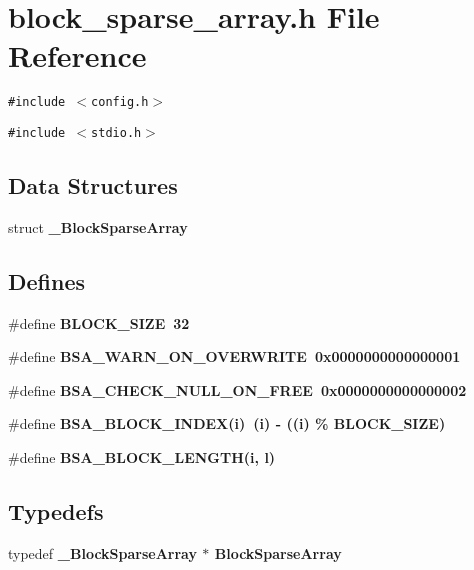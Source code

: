 \section{block\_\-sparse\_\-array.h File Reference}
\label{block__sparse__array_8h}
{\tt \#include $<$config.h$>$}\par
{\tt \#include $<$stdio.h$>$}\par
\subsection*{Data Structures}
\begin{CompactItemize}
\item 
struct \bf{\_\-Block\-Sparse\-Array}
\end{CompactItemize}
\subsection*{Defines}
\begin{CompactItemize}
\item 
\#define \bf{BLOCK\_\-SIZE}~32
\item 
\#define \bf{BSA\_\-WARN\_\-ON\_\-OVERWRITE}~0x0000000000000001
\item 
\#define \bf{BSA\_\-CHECK\_\-NULL\_\-ON\_\-FREE}~0x0000000000000002
\item 
\#define \bf{BSA\_\-BLOCK\_\-INDEX}(i)~(i) - ((i) \% BLOCK\_\-SIZE)
\item 
\#define \bf{BSA\_\-BLOCK\_\-LENGTH}(i, l)
\end{CompactItemize}
\subsection*{Typedefs}
\begin{CompactItemize}
\item 
typedef \bf{\_\-Block\-Sparse\-Array} $\ast$ \bf{Block\-Sparse\-Array}
\end{CompactItemize}
